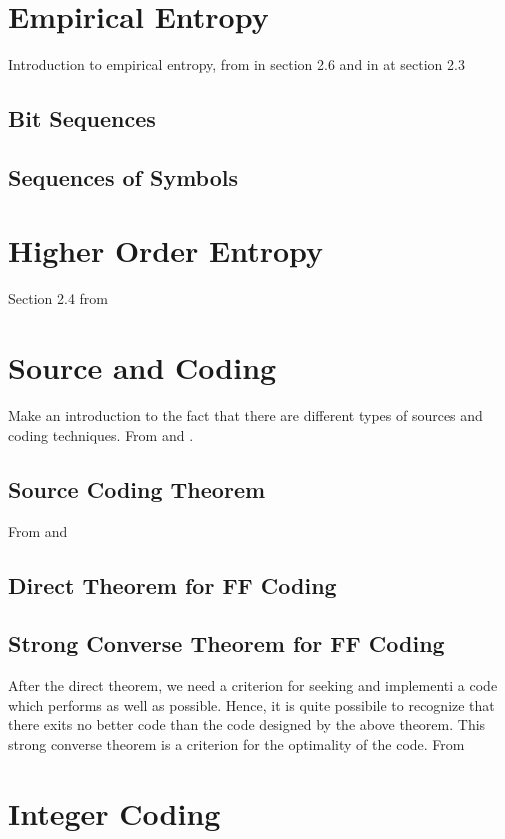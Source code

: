 \section{Empirical Entropy}
Introduction to empirical entropy, from \cite{han2002mathematics} in section 2.6 and in \cite{navarro2016compact} at section 2.3
\subsection{Bit Sequences}
\subsection{Sequences of Symbols}

\section{Higher Order Entropy}
Section 2.4 from \cite{navarro2016compact}

\section{Source and Coding}
Make an introduction to the fact that there are different types of sources and coding techniques. From \cite{han2002mathematics} and \cite{ElementsofInformationTheory}.

\subsection{Source Coding Theorem}
From \cite{Shannon1948} and \cite{han2002mathematics}

\subsection{Direct Theorem for FF Coding}


\subsection{Strong Converse Theorem for FF Coding}
After the direct theorem, we need a criterion for seeking and implementi a code which performs as well as possible. Hence, it is quite possibile to recognize that there exits no better code than the code designed by the above theorem. This strong converse theorem is a criterion for the optimality of the code. From \cite{han2002mathematics}

\section{Integer Coding}

